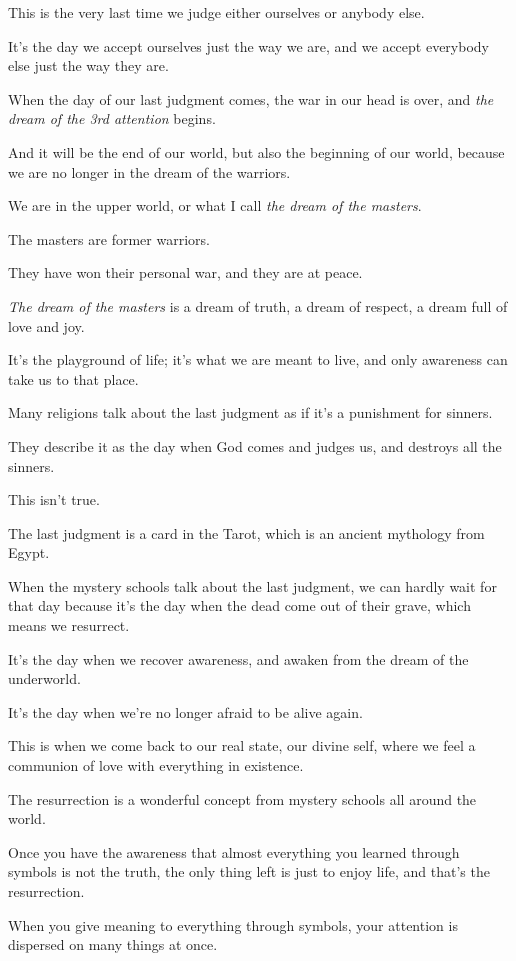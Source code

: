\documentclass{article}
\numberwithin{equation}{section}
\begin{document}
This is the very last time we judge either ourselves or anybody else.

It's the day we accept ourselves just the way we are, and we accept everybody else just the way they are.

When the day of our last judgment comes, the war in our head is over, and \textit{the dream of the 3rd attention} begins.

And it will be the end of our world, but also the beginning of our world, because we are no longer in the dream of the warriors.

We are in the upper world, or what I call \textit{the dream of the masters}.

%
The masters are former warriors.

They have won their personal war, and they are at peace.

\textit{The dream of the masters} is a dream of truth, a dream of respect, a dream full of love and joy.

It's the playground of life; it's what we are meant to live, and only awareness can take us to that place.

Many religions talk about the last judgment as if it's a punishment for sinners.

They describe it as the day when God comes and judges us, and destroys all the sinners.

This isn't true.

The last judgment is a card in the Tarot, which is an ancient mythology from Egypt.

When the mystery schools talk about the last judgment, we can hardly wait for that day because it's the day when the dead come out of their grave, which means we resurrect.

It's the day when we recover awareness, and awaken from the dream of the underworld.

It's the day when we're no longer afraid to be alive again.

This is when we come back to our real state, our divine self, where we feel a communion of love with everything in existence.

%
The resurrection is a wonderful concept from mystery schools all around the world.

Once you have the awareness that almost everything you learned through symbols is not the truth, the only thing left is just to enjoy life, and that's the resurrection.

When you give meaning to everything through symbols, your attention is dispersed on many things at once.
\end{document}
